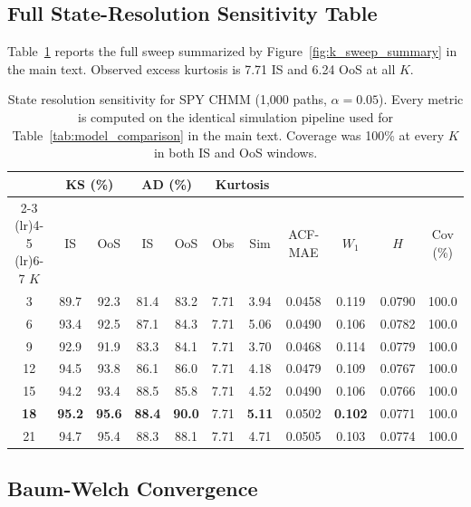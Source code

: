 \subsection{Full State-Resolution Sensitivity Table}
\label{sec:sensitivity_table}

Table~\ref{tab:sensitivity} reports the full sweep summarized by Figure~\ref{fig:k_sweep_summary} in the main text.
Observed excess kurtosis is 7.71 IS and 6.24 OoS at all $K$.

\begin{table}[H]
\centering
\caption{State resolution sensitivity for SPY CHMM (1{,}000 paths, $\alpha = 0.05$). Every metric is computed on the identical simulation pipeline used for Table~\ref{tab:model_comparison} in the main text. Coverage was 100\% at every $K$ in both IS and OoS windows.}
\label{tab:sensitivity}
\small
\begin{tabular}{c cc cc cc c c c c}
\toprule
& \multicolumn{2}{c}{KS (\%)} & \multicolumn{2}{c}{AD (\%)} & \multicolumn{2}{c}{Kurtosis} & & & & \\
\cmidrule(lr){2-3} \cmidrule(lr){4-5} \cmidrule(lr){6-7}
$K$ & IS & OoS & IS & OoS & Obs & Sim & ACF-MAE & $W_1$ & $H$ & Cov (\%) \\
\midrule
3  & 89.7 & 92.3 & 81.4 & 83.2 & 7.71 & 3.94 & 0.0458 & 0.119 & 0.0790 & 100.0 \\
6  & 93.4 & 92.5 & 87.1 & 84.3 & 7.71 & 5.06 & 0.0490 & 0.106 & 0.0782 & 100.0 \\
9  & 92.9 & 91.9 & 83.3 & 84.1 & 7.71 & 3.70 & 0.0468 & 0.114 & 0.0779 & 100.0 \\
12 & 94.5 & 93.8 & 86.1 & 86.0 & 7.71 & 4.18 & 0.0479 & 0.109 & 0.0767 & 100.0 \\
15 & 94.2 & 93.4 & 88.5 & 85.8 & 7.71 & 4.52 & 0.0490 & 0.106 & 0.0766 & 100.0 \\
\textbf{18} & \textbf{95.2} & \textbf{95.6} & \textbf{88.4} & \textbf{90.0} & 7.71 & \textbf{5.11} & 0.0502 & \textbf{0.102} & 0.0771 & 100.0 \\
21 & 94.7 & 95.4 & 88.3 & 88.1 & 7.71 & 4.71 & 0.0505 & 0.103 & 0.0774 & 100.0 \\
\bottomrule
\end{tabular}
\end{table}

\subsection{Baum-Welch Convergence}
\label{sec:convergence}

